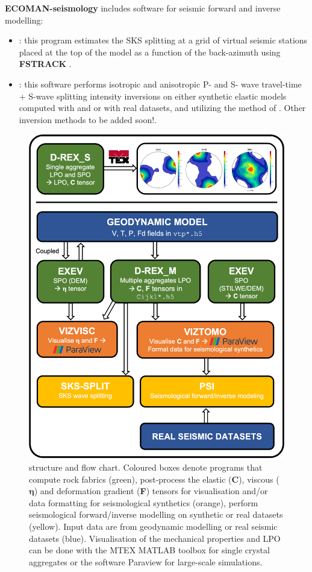 \textbf{ECOMAN-seismology} includes software for seismic forward and inverse modelling:
\begin{itemize}
    \item \textbf{\skstitle}: this program estimates the SKS splitting at a grid of virtual seismic stations placed at the top of the \drexmtitle{} model as a function of the back-azimuth using \textbf{FSTRACK} \citep{becker2006epsl}.
    
    \item \textbf{\psitomotitle}: this software performs isotropic and anisotropic P- and S- wave travel-time + S-wave splitting intensity inversions on either synthetic elastic models computed with \drexmtitle{} and \viztomotitle{} or with real datasets, and utilizing the method of \citep{vanderbeek2021,vanderbeek2023}. Other inversion methods to be added soon!.
\end{itemize}


\begin{figure}
    \centering
    \includegraphics[width=1.0\textwidth]{introduction/FlowChartnew.png}
    \caption{\thesistitle{} structure and flow chart. Coloured boxes denote programs that compute rock fabrics (green), post-process the elastic (\textbf{C}), viscous ($\pmb{\eta}$) and deformation gradient (\textbf{F}) tensors for visualisation and/or data formatting for seismological synthetics (orange), perform seismological forward/inverse modelling on synthetic or real datasets (yellow).  Input data are from geodynamic modelling or real seismic datasets (blue). Visualisation of the mechanical properties and LPO can be done with the MTEX MATLAB toolbox for single crystal aggregates or the software Paraview for large-scale simulations.}
    \label{fig:flowchart}
\end{figure}

